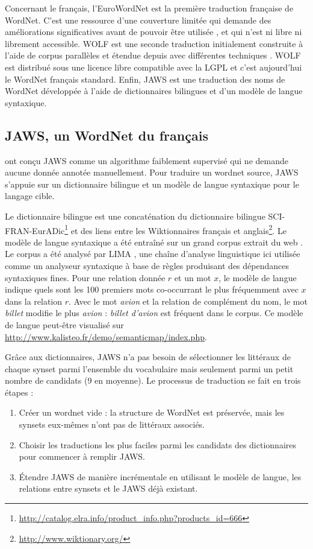 Concernant le français, l'EuroWordNet \citep{vossen1998eurowordnet} est la
première traduction française de WordNet. C'est une ressource d'une couverture
limitée qui demande des améliorations significatives avant de pouvoir être
utilisée \citep{jacquin2006systemes}, et qui n'est ni libre ni librement
accessible. WOLF est une seconde traduction initialement construite à l'aide de
corpus parallèles \citep{sagot2008construction} et étendue depuis avec
différentes techniques \citep{apidianaki2012applying}. WOLF est distribué sous
une licence libre compatible avec la LGPL et c'est aujourd'hui le WordNet
français standard. Enfin, JAWS \citep{mouton2010jaws} est une traduction des
noms de WordNet développée à l'aide de dictionnaires bilingues et d'un modèle
de langue syntaxique.

\subsection{JAWS, un WordNet du français}
\label{subsec:translation_process}

\cite{mouton2010jaws} ont conçu JAWS comme un algorithme faiblement supervisé
qui ne demande aucune donnée annotée manuellement. Pour traduire un wordnet
source, JAWS s'appuie sur un dictionnaire bilingue et un modèle de langue
syntaxique pour le langage cible.

Le dictionnaire bilingue est une concaténation du dictionnaire bilingue
SCI-FRAN-EurADic\footnote{\url{http://catalog.elra.info/product_info.php?products_id=666}}
et des liens entre les Wiktionnaires français et
anglais\footnote{\url{http://www.wiktionary.org/}}. Le modèle de langue
syntaxique a été entraîné sur un grand corpus extrait du web
\citep{grefenstette2007conquering}. Le corpus a été analysé par LIMA
\citep{besancon2010lima}, une chaîne d'analyse linguistique ici utilisée comme
un analyseur syntaxique à base de règles produisant des dépendances syntaxiques
fines. Pour une relation donnée $r$ et un mot $x$, le modèle de langue indique
quels sont les 100 premiers mots co-occurrant le plus fréquemment avec $x$ dans
la relation $r$. Avec le mot \textit{avion} et la relation de complément du
nom, le mot \textit{billet} modifie le plus \textit{avion} : \textit{billet
d'avion} est fréquent dans le corpus. Ce modèle de langue peut-être visualisé
sur \url{http://www.kalisteo.fr/demo/semanticmap/index.php}.

Grâce aux dictionnaires, JAWS n'a pas besoin de sélectionner les littéraux de chaque synset parmi l'ensemble du vocabulaire mais seulement parmi un petit nombre de candidats (9 en moyenne). Le processus de traduction se fait en trois étapes :
\begin{enumerate}
    \item Créer un wordnet vide : la structure de WordNet est préservée, mais les synsets eux-mêmes n'ont pas de littéraux associés.
    \item Choisir les traductions les plus faciles parmi les candidats des dictionnaires pour commencer à remplir JAWS.
    \item Étendre JAWS de manière incrémentale en utilisant le modèle de langue, les relations entre synsets et le JAWS déjà existant.
\end{enumerate}

